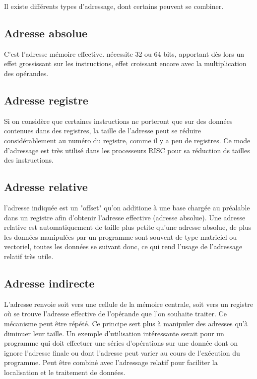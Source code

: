 \documentclass{report}
\begin{document}
Il existe différents types d'adressage, dont certains peuvent se combiner.\\

\subsection{Adresse absolue} 
C'est l'adresse mémoire effective. nécessite 32 ou 64 bits, apportant dès lors un effet grossissant sur les instructions, effet croissant encore avec la multiplication des opérandes.\\
\subsection{Adresse registre}
Si on considère que certaines instructions ne porteront que sur des données contenues dans des registres, la taille de l'adresse peut se réduire considérablement au numéro du registre, comme il y a peu de registres. Ce mode d'adressage est très utilisé dans les processeurs RISC pour sa réduction ds tailles des instructions.\\
\subsection{Adresse relative}
l'adresse indiquée est un "offset" qu'on additione à une base chargée au préalable dans un registre afin d'obtenir l'adresse effective (adresse absolue). Une adresse relative est automatiquement de taille plus petite qu'une adresse absolue, de plus les données manipulées par un programme sont souvent de type matriciel ou vectoriel, toutes les données se suivant donc, ce qui rend l'usage de l'adressage relatif très utile.\\
\subsection{Adresse indirecte}
L'adresse renvoie soit vers une cellule de la mémoire centrale, soit vers un registre où se trouve l'adresse effective de l'opérande que l'on souhaite traiter. Ce mécanisme peut être répété. Ce principe sert plus à manipuler des adresses qu'à diminuer leur taille. Un exemple d'utilisation intéressante serait pour un programme qui doit effectuer une séries d'opérations sur une donnée dont on ignore l'adresse finale ou dont l'adresse peut varier au cours de l'exécution du programme. Peut être combiné avec l'adressage relatif pour faciliter la localisation et le traitement de données.\\ 
\end{document}

